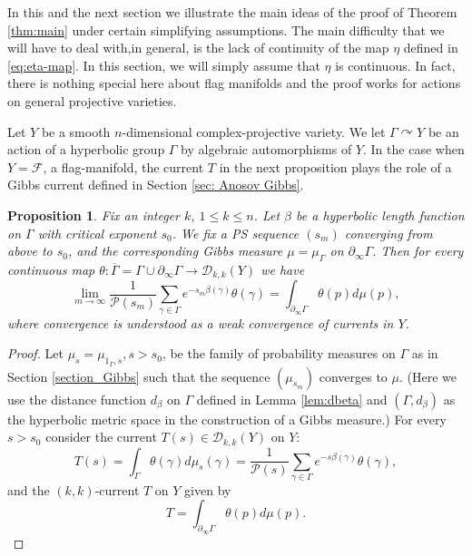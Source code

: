 \documentclass[12pt]{amsbook}%
\newtheorem{prop}[thm]{Proposition}
\theoremstyle{definition}
\theoremstyle{remark}
\numberwithin{section}{chapter}
\numberwithin{subsection}{section}
\numberwithin{figure}{chapter}
\DeclareMathOperator{\acts}{\curvearrowright}
\def\cF{{\mathscr{F}}}
\def\cP{{\mathscr{P}}}
\def\Ga{\Gamma}
\def\ga{\gamma}
\def\geo{\partial_\infty}
\def\ol{\overline}
\def\mini{\scriptsize}
\begin{document}
{{In this and the next section we illustrate the main ideas of the proof of Theorem \ref{thm:main} under certain simplifying assumptions. 
The main difficulty that we will have to deal with,in general, is the lack of continuity of the map $\eta$ defined in \eqref{eq:eta-map}. 
In this section, we will simply assume that  $\eta$ is continuous.  In fact, there is nothing special here about flag manifolds and the proof works for actions on general projective varieties. 


Let $Y$ be a smooth $n$-dimensional com\-plex-projective variety. We let $\Gamma\acts Y$ be an action of a hyperbolic group $\Ga$ by algebraic automorphisms of $Y$. 
In the case when $Y=\cF$, a flag-manifold, the current $T$ in the next proposition plays the role of a Gibbs current defined in Section \ref{sec: Anosov Gibbs}. 


\begin{prop} \label{prop:poincare_series_current}
 Fix an integer $k$, $1 \leqslant k \leqslant n$. Let $\beta$ be a hyperbolic length function on $\Ga$ with critical exponent $s_0$. We fix a PS sequence $(s_m)$ converging from above to $s_0$, and the corresponding Gibbs measure $\mu=\mu_{\Ga}$ on $\geo \Ga$. 
 Then for every continuous map $\theta \colon \ol{\Ga}= \Gamma \cup \geo \Gamma \to \mathcal{D}_{k,k}(Y)$ we have 
\begin{equation}
\lim_{m \rightarrow \infty} \dfrac{1}{\cP(s_m)}\sum_{\gamma \in \Gamma} e^{-s_m \beta(\gamma)} \theta(\gamma) = 
\int_{\geo \Ga} \theta(p) d\mu(p),  
\end{equation}
where convergence is understood as a weak convergence  of currents in $Y$. 
\end{prop}
\begin{proof}
Let $\mu_s=\mu_{1_\Ga,s}, s>s_0$, be the family of probability measures on $\Ga$ as in Section \ref{section_Gibbs} such that the sequence $(\mu_{s_m})$ converges to $\mu$. (Here we use the distance function $d_\beta$ on $\Ga$ defined in Lemma \ref{lem:dbeta} and 
$(\Ga,d_\beta)$ as the hyperbolic metric space in the construction of a Gibbs measure.) 
For every $s>s_0$ consider the current $T(s)\in \mathcal{D}_{k,k}(Y)$ on $Y$:
\begin{equation}
T(s) = \int_{\Gamma} \theta (\ga) d\mu_s(\ga)= \dfrac{1}{\cP(s)}\sum_{\gamma \in \Gamma} e^{-s \beta(\gamma)} \theta(\gamma), 
\end{equation}
and the $(k,k)$-current $T$ on $Y$ given by 
\begin{equation}
T = \int_{\geo \Gamma} \theta(p) d\mu(p). 
\end{equation}


\end{proof}}}
\end{document}
